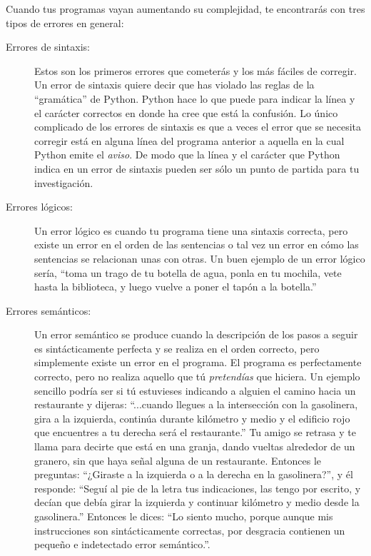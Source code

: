 Cuando tus programas vayan aumentando su complejidad, te encontrarás con
tres tipos de errores en general:

\begin{description}

\item[Errores de sintaxis:] Estos son los primeros errores que cometerás y los más
fáciles de corregir. Un error de sintaxis quiere decir que has violado las reglas de la
``gramática'' de Python. Python hace lo que puede para indicar la línea y el carácter
correctos en donde ha cree que está la confusión. Lo único complicado de los errores de
sintaxis es que a veces el error que se necesita corregir está en alguna línea del
programa anterior a aquella en la cual Python emite el {\em aviso}. De modo que la línea
y el carácter que Python indica en un error de sintaxis pueden ser sólo un punto de
partida para tu investigación.  

\item[Errores lógicos:] Un error lógico es cuando tu programa tiene una sintaxis correcta,
pero existe un error en el orden de las sentencias o tal vez un error en cómo las
sentencias se relacionan unas con otras.
Un buen ejemplo de un error lógico sería, ``toma un trago de tu botella de agua, ponla
en tu mochila, vete hasta la biblioteca, y luego vuelve a poner el tapón a la botella.'' 

\item[Errores semánticos:] Un error semántico se produce cuando la descripción de los
pasos a seguir es sintácticamente perfecta y se realiza en el orden correcto, pero
simplemente existe un error en el programa. El programa es perfectamente correcto, pero
no realiza aquello que tú {\em pretendías} que hiciera. Un ejemplo sencillo podría ser
si tú estuvieses indicando a alguien el camino hacia un restaurante y dijeras:
``...cuando llegues a la intersección con la gasolinera, gira a la izquierda, continúa
durante kilómetro y medio y el edificio rojo que encuentres a tu derecha será el restaurante.''
Tu amigo se retrasa y te llama para decirte que está en una granja, dando vueltas alrededor
de un granero, sin que haya señal alguna de un restaurante.
Entonces le preguntas: ``¿Giraste a la izquierda o a la derecha en la gasolinera?'', y él
responde: ``Seguí al pie de la letra tus indicaciones, las tengo por escrito, y decían
que debía girar la izquierda y continuar kilómetro y medio desde la gasolinera.'' Entonces
le dices: ``Lo siento mucho, porque aunque mis instrucciones son sintácticamente
correctas, por desgracia contienen un pequeño e indetectado error semántico.''.

\end{description}

